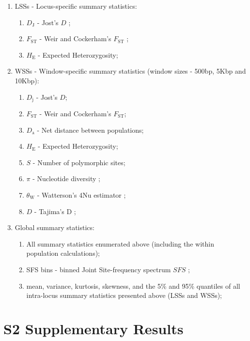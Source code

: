\documentclass[a4paper, 12pt]{article}
\begin{document}
\begin{enumerate}
 \item LSSs - Locus-specific summary statistics:
    \begin{enumerate}
     \item $D_{\mathrm{J}}$ - Jost's $D$ \citep{Jost:2008cs,Jost:2009hn};
        \item $F_{\mathrm{ST}}$ - Weir and Cockerham's $F_{\mathrm{ST}}$ \citep{Weir:1984dx};
        \item $H_{\mathrm{E}}$ - Expected Heterozygosity;
    \end{enumerate}
    \item WSSs - Window-specific summary statistics (window sizes - 500bp, 5Kbp and 10Kbp):
    \begin{enumerate}
        \item $D_{\mathrm{j}}$ - Jost's $D$;
        \item $F_{\mathrm{ST}}$ - Weir and Cockerham's $F_{\mathrm{ST}}$;
        \item $D_{\mathrm{a}}$ - Net distance between populations;
        \item $H_{\mathrm{E}}$ - Expected Heterozygosity;
        \item $S$ - Number of polymorphic sites;
        \item $\pi$ - Nucleotide diversity \citep{Nei:1979uk};
        \item $\theta_{\mathrm{W}}$ - Watterson's 4Nu estimator \citep{Watterson:1975bh};
        \item $D$ - Tajima's D \citep{Tajima:1989un};
    \end{enumerate}
    \item Global summary statistics:
    \begin{enumerate}
        \item All summary statistics enumerated above (including the within population calculations);
        \item SFS bins - binned Joint Site-frequency spectrum $SFS$ \citep{Ewing:2016gv};
        \item mean, variance, kurtosis, skewness, and the 5\% and 95\% quantiles of all intra-locus summary statistics presented above (LSSs and WSSs);
    \end{enumerate}
\end{enumerate}

\section*{S2 Supplementary Results}
\end{document}
